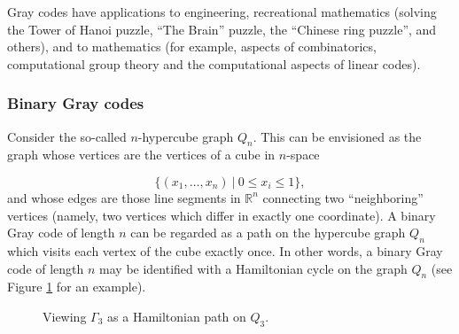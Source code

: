 Gray codes have applications to engineering,
recreational mathematics (solving the Tower of Hanoi
puzzle, ``The Brain'' puzzle, the ``Chinese ring puzzle'',
and others), and to mathematics (for example, aspects of
combinatorics, computational group theory
and the computational aspects of linear codes).

\subsubsection{Binary Gray codes}

Consider the so-called $n$-hypercube graph
$Q_n$. This can be envisioned as the graph whose
vertices are the vertices of a cube in
$n$-space

\[
\{(x_1,\dots,x_n)\ |\ 0\leq x_i\leq 1\},
\]
and whose edges are those line segments in
${\mathbb{R}}^n$ connecting two ``neighboring''
vertices (namely, two vertices which differ
in exactly one coordinate).
A binary Gray code of length $n$ can be regarded as a
path on the hypercube graph $Q_n$ which visits
each vertex of the cube exactly once.
In other words, a binary Gray code of length $n$
may be identified with a
Hamiltonian cycle on the graph $Q_n$
(see Figure \ref{fig:trees_forests:gray_code_cube} for an example).

\begin{figure}[!htbp]
\centering
{}
\caption{Viewing $\Gamma_3$ as a Hamiltonian path on $Q_3$.}
\label{fig:trees_forests:gray_code_cube}
\end{figure}


